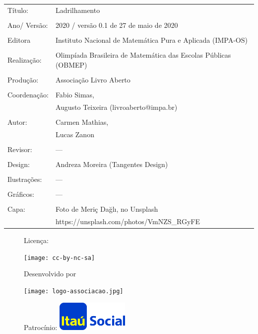 \begin{tabular}{p{}p{}}
Título: & Ladrilhamento\\
\\
Ano/ Versão: & 2020 / versão 0.1 de 27 de maio de 2020\\
\\
Editora & Instituto Nacional de Matem\'atica Pura e Aplicada (IMPA-OS)\\
\\
Realização:& Olimp\'iada Brasileira de Matem\'atica das Escolas P\'ublicas (OBMEP)\\
\\
Produção:& Associação Livro Aberto\\
\\
Coordenação: & Fabio Simas, \\
			&  Augusto Teixeira (livroaberto@impa.br)\\
\\
  Autor: & Carmen Mathias, \\
         & Lucas Zanon \\
\\
Revisor: &  ---  \\
\\
Design: & Andreza Moreira (Tangentes Design) \\
\\
  Ilustrações: & --- \\ 
\\
Gráficos: & --- \\
\\
  Capa: & Foto de Meriç Dağlı, no Unsplash \\
  		& https://unsplash.com/photos/VmNZS\_RGyFE \\

\end{tabular}


\begin{figure}[b]
\begin{minipage}[l]{5cm}
\centering

{\large Licença:}

  \texttt{[image: cc-by-nc-sa]}
\end{minipage}\hfill
\begin{minipage}[c]{5cm}
\centering
{\large Desenvolvido por}

\texttt{[image: logo-associacao.jpg]}
\end{minipage}
\begin{minipage}[r]{5cm}
\centering

{\large Patrocínio:}
  \vspace{1em}
  \includegraphics[width=3.5cm]{itau}
\end{minipage}
\end{figure}

